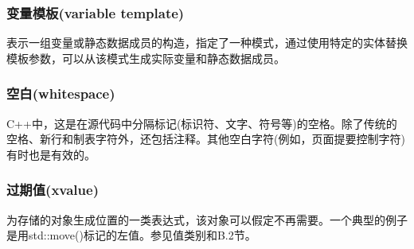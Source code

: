 \subsubsection{变量模板(variable template)}

表示一组变量或静态数据成员的构造，指定了一种模式，通过使用特定的实体替换模板参数，可以从该模式生成实际变量和静态数据成员。

\subsubsection{空白(whitespace)}

C++中，这是在源代码中分隔标记(标识符、文字、符号等)的空格。除了传统的空格、新行和制表字符外，还包括注释。其他空白字符(例如，页面提要控制字符)有时也是有效的。

\subsubsection{过期值(xvalue)}

为存储的对象生成位置的一类表达式，该对象可以假定不再需要。一个典型的例子是用std::move()标记的左值。参见值类别和B.2节。




















